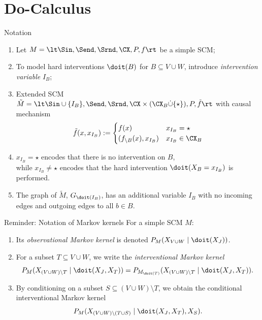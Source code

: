 \part{Do-Calculus}
\frame{\partpage}

\begin{frame}{Notation}
  \begin{enumerate}
    \item Let $M = \lt \Sin, \Send, \Srnd, \CX, P, f \rt$ be a simple SCM;
    \item To model hard interventions $\doit(B)$ for $B \subseteq V \cup W$, introduce \emph{intervention variable} $I_B$;
    \item Extended SCM $\tilde{M} = \lt \Sin \cup \{I_B\}, \Send, \Srnd, \CX \times (\CX_B \dot\cup \{\star\}), P, \tilde{f} \rt$ with causal mechanism
$$\tilde{f}(x,x_{I_B}) := \begin{cases}
  f(x) & x_{I_B} = \star \\
  (f_{\setminus B}(x), x_{I_B}) & x_{I_B} \in \CX_B
\end{cases}$$
    \item $x_{I_B} = \star$ encodes that there is no intervention on $B$,\\
while $x_{I_B} \ne \star$ encodes that the hard intervention $\doit(X_B = x_{I_B})$ is performed.
\item The graph of $\tilde{M}$, $G_{\doit(I_B)}$, has an additional variable $I_B$ with no incoming edges
  and outgoing edges to all $b \in B$.
  \end{enumerate}
\end{frame}

\begin{frame}{Reminder: Notation of Markov kernels}
  For a simple SCM $M$:
  \begin{enumerate}
    \item Its \emph{observational Markov kernel} is denoted $P_{M}(X_{V\cup W} \mid \doit(X_J))$.
    \item For a subset $T \subseteq V \cup W$, we write the \emph{interventional Markov kernel}
$$P_{M}(X_{(V\cup W)\setminus T} \mid \doit(X_J,X_T)) = P_{M_{\doit(T)}}(X_{(V\cup W)\setminus T} \mid \doit(X_J,X_T)).$$
\item By conditioning on a subset $S \subseteq (V \cup W) \setminus T$, we obtain the conditional interventional Markov kernel
$$P_{M}(X_{(V\cup W)\setminus (T \cup S)} \mid \doit(X_J,X_T), X_S).$$
  \end{enumerate}
\end{frame}

